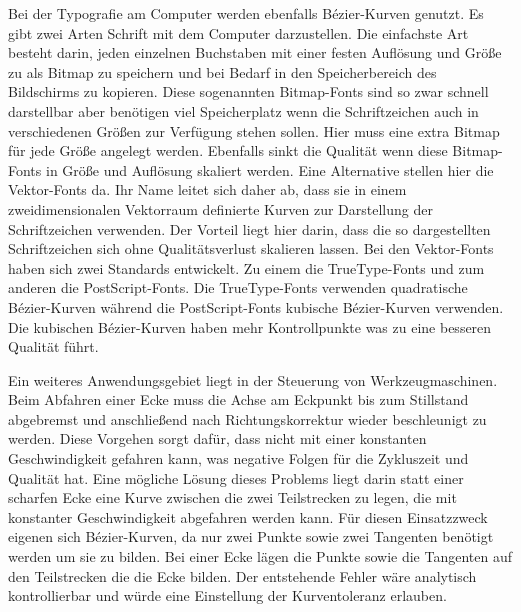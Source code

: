 Bei der Typografie am Computer werden ebenfalls Bézier-Kurven genutzt. Es gibt zwei Arten Schrift mit dem Computer darzustellen. Die einfachste Art besteht darin, jeden einzelnen Buchstaben mit einer festen Auflösung und Größe zu als Bitmap zu speichern und bei Bedarf in den Speicherbereich des Bildschirms zu kopieren. Diese sogenannten Bitmap-Fonts sind so zwar schnell darstellbar aber benötigen viel Speicherplatz wenn die Schriftzeichen auch in verschiedenen Größen zur Verfügung stehen sollen. Hier muss eine extra Bitmap für jede Größe angelegt werden.  Ebenfalls sinkt die Qualität wenn diese Bitmap-Fonts in Größe  und Auflösung skaliert werden. Eine Alternative stellen hier  die Vektor-Fonts da. Ihr Name leitet sich daher ab, dass sie  in einem zweidimensionalen Vektorraum definierte Kurven zur  Darstellung der Schriftzeichen verwenden. Der Vorteil liegt  hier darin, dass die so dargestellten Schriftzeichen sich  ohne Qualitätsverlust skalieren lassen. Bei den Vektor-Fonts  haben sich zwei Standards entwickelt. Zu einem die TrueType-Fonts und zum anderen die PostScript-Fonts.  Die TrueType-Fonts verwenden quadratische Bézier-Kurven  während die PostScript-Fonts kubische Bézier-Kurven  verwenden. Die kubischen Bézier-Kurven haben mehr  Kontrollpunkte was zu eine besseren Qualität  führt.\autocite{Malaka:2009}
 
 \bigskip
 

Ein weiteres Anwendungsgebiet liegt in der Steuerung von Werkzeugmaschinen. Beim Abfahren einer Ecke muss die Achse am Eckpunkt bis zum Stillstand abgebremst und anschließend nach Richtungskorrektur wieder beschleunigt zu werden. Diese Vorgehen sorgt dafür, dass nicht mit einer konstanten Geschwindigkeit gefahren kann, was negative Folgen für die Zykluszeit und Qualität hat. Eine mögliche Lösung dieses Problems liegt darin statt einer scharfen Ecke eine Kurve zwischen die zwei Teilstrecken zu legen, die mit konstanter Geschwindigkeit abgefahren werden kann. Für diesen Einsatzzweck eigenen sich Bézier-Kurven, da nur zwei Punkte sowie zwei Tangenten benötigt werden um sie zu bilden. Bei einer Ecke lägen die Punkte sowie die Tangenten auf den Teilstrecken die die Ecke bilden. Der entstehende Fehler wäre analytisch kontrollierbar und würde eine Einstellung der Kurventoleranz erlauben.\autocite{Sencer:2014}